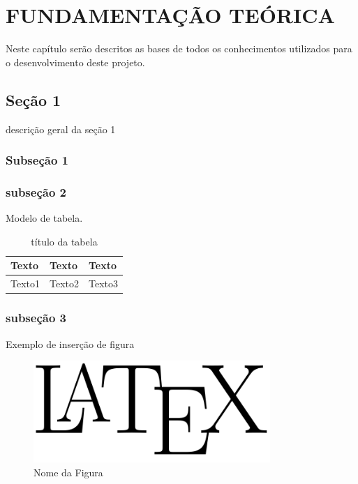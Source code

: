 \chapter{FUNDAMENTAÇÃO TEÓRICA}\label{fund}
Neste capítulo serão descritos as bases de todos os conhecimentos utilizados para o desenvolvimento deste projeto.
\section{Seção 1}\label{label1}

descrição geral da seção 1

\subsection{Subseção 1}\label{labelS1}


\subsection{subseção 2}

Modelo de tabela.

\begin{table}[htbp!]
  \centering
    \caption{título da tabela}
      \begin{tabularx}{\textwidth}{|X|X|X|}
      \hline
      \textbf{Texto} &  \textbf{Texto} & \textbf{Texto} \\
      \hline
      Texto1 & Texto2 & Texto3 \\
      \hline
      \end{tabularx}
  \label{Tabela1}
\end{table}

\subsection{subseção 3}\label{labels3}
Exemplo de inserção de figura

\begin{figure}[htp!]
\centering
\includegraphics[width=0.80\textwidth]{figuras/latex.png}
\caption{Nome da Figura}
\label{figura1}
\end{figure}
\pagebreak

